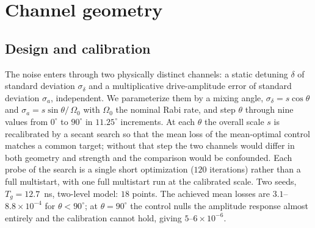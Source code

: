 \documentclass[aps,pra,onecolumn,notitlepage,superscriptaddress,nofootinbib,floatfix]{revtex4-2}
\begin{document}
\section{Channel geometry}
\label{sec:stage1b}

\subsection{Design and calibration}
The noise enters through two physically distinct channels: a static detuning
$\delta$ of standard deviation $\sigma_\delta$ and a multiplicative
drive-amplitude error of standard deviation $\sigma_a$, independent. We
parameterize them by a mixing angle, $\sigma_\delta=s\cos\theta$ and
$\sigma_a=s\sin\theta/\,\Omega_0$ with $\Omega_0$ the nominal Rabi rate, and
step $\theta$ through nine values from $0^\circ$ to $90^\circ$ in
$11.25^\circ$ increments. At each $\theta$ the overall scale $s$ is
recalibrated by a secant search so that the mean loss of the mean-optimal
control matches a common target; without that step the two channels would
differ in both geometry and strength and the comparison would be confounded.
Each probe of the search is a single short optimization ($120$ iterations)
rather than a full multistart, with one full multistart run at the calibrated
scale. Two seeds, $T_g=12.7$~ns, two-level model: $18$ points. The achieved
mean losses are $3.1$--$8.8\times10^{-4}$ for $\theta<90^\circ$; at
$\theta=90^\circ$ the control nulls the amplitude response almost entirely and
the calibration cannot hold, giving $5$--$6\times10^{-6}$.
\end{document}
